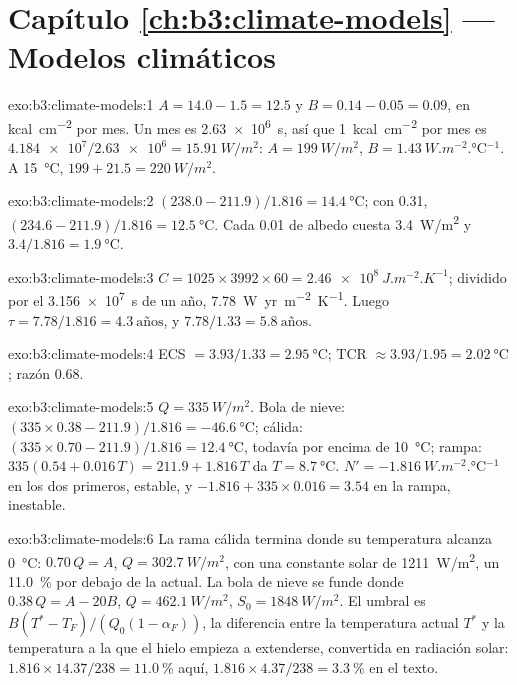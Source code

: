 \section*{Capítulo \ref{ch:b3:climate-models} --- Modelos climáticos}

\begin{solution}{exo:b3:climate-models:1}
$A = 14.0 - 1.5 = \num{12.5}$ y $B = 0.14 - 0.05 = \num{0.09}$, en
\unit{kcal.cm^{-2}} por mes. Un mes es \qty{2.63e6}{s}, así que
\qty{1}{kcal.cm^{-2}} por mes es $\num{4.184e7}/\num{2.63e6} =
\qty{15.91}{W/m^2}$: $A = \qty{199}{W/m^2}$, $B =
\qty{1.43}{W.m^{-2}.\celsius^{-1}}$. A \qty{15}{\celsius}, $199 + 21.5 =
\qty{220}{W/m^2}$.
\end{solution}

\begin{solution}{exo:b3:climate-models:2}
$(238.0 - 211.9)/1.816 = \qty{14.4}{\celsius}$; con 0.31, $(234.6 -
211.9)/1.816 = \qty{12.5}{\celsius}$. Cada 0.01 de albedo cuesta
\qty{3.4}{W/m^2} y $3.4/1.816 = \qty{1.9}{\celsius}$.
\end{solution}

\begin{solution}{exo:b3:climate-models:3}
$C = 1025\times3992\times60 = \qty{2.46e8}{J.m^{-2}.K^{-1}}$; dividido por
el \qty{3.156e7}{s} de un año, \qty{7.78}{W.yr.m^{-2}.K^{-1}}. Luego $\tau
= 7.78/1.816 = \num{4.3}~\text{años}$, y $7.78/1.33 = \num{5.8}~\text{años}$.
\end{solution}

\begin{solution}{exo:b3:climate-models:4}
ECS $= 3.93/1.33 = \qty{2.95}{\celsius}$; TCR $\approx 3.93/1.95 =
\qty{2.02}{\celsius}$; razón \num{0.68}.
\end{solution}

\begin{solution}{exo:b3:climate-models:5}
$Q = \qty{335}{W/m^2}$. Bola de nieve: $(335\times0.38 - 211.9)/1.816 =
\qty{-46.6}{\celsius}$; cálida: $(335\times0.70 - 211.9)/1.816 =
\qty{12.4}{\celsius}$, todavía por encima de \qty{10}{\celsius}; rampa: $335(0.54 +
0.016\,T) = 211.9 + 1.816\,T$ da $T = \qty{8.7}{\celsius}$. $N' =
\qty{-1.816}{W.m^{-2}.\celsius^{-1}}$ en los dos primeros, estable, y $-1.816
+ 335\times0.016 = \num{+3.54}$ en la rampa, inestable.
\end{solution}

\begin{solution}{exo:b3:climate-models:6}
La rama cálida termina donde su temperatura alcanza \qty{0}{\celsius}:
$0.70\,Q = A$, $Q = \qty{302.7}{W/m^2}$, con una constante solar de
\qty{1211}{W/m^2}, un \qty{11.0}{\percent} por debajo de la actual. La bola de nieve se funde
donde $0.38\,Q = A - 20B$, $Q = \qty{462.1}{W/m^2}$, $S_0 =
\qty{1848}{W/m^2}$. El umbral es $B(T^* - T_F)/(Q_0(1 - \alpha_F))$,
la diferencia entre la temperatura actual $T^*$ y la temperatura a la que el
hielo empieza a extenderse, convertida en radiación solar: $1.816\times14.37/238 =
\qty{11.0}{\percent}$ aquí, $1.816\times4.37/238 = \qty{3.3}{\percent}$ en
el texto.
\end{solution}


